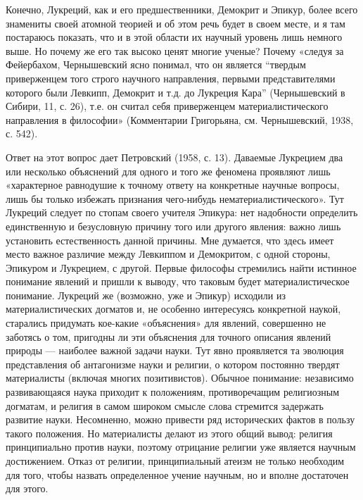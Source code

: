 Конечно, Лукреций, как и его предшественники, Демокрит и Эпикур, более
всего знамениты  своей атомной теорией  и об  этом речь будет  в своем
месте,  и  я  там  постараюсь  показать,  что  и  в  этой  области  их
научный  уровень  лишь немного  выше.  Но  почему  же его  так  высоко
ценят многие  ученые? Почему «следуя за  Фейербахом, Чернышевский ясно
понимал, что  он является ``твердым приверженцем  того строго научного
направления, первыми представителями которого были Левкипп, Демокрит и
т.д. до  Лукреция Кара'' (Чернышевский в  Сибири, 11, с. 26),  т.е. он
считал себя приверженцем  материалистического направления в философии»
(Комментарии Григорьяна, см. Чернышевский, 1938, с. 542).

Ответ  на  этот  вопрос  дает   Петровский  (1958,  с.  13).  Даваемые
Лукрецием два или  несколько объяснений для одного и  того же феномена
проявляют лишь «характерное равнодушие  к точному ответу на конкретные
научные  вопросы,  лишь  бы   только  избежать  признания  чего-нибудь
нематериалистического». Тут Лукреций следует  по стопам своего учителя
Эпикура: нет надобности определить  единственную и безусловную причину
того или другого явления:  важно лишь установить естественность данной
причины. Мне  думается, что  здесь имеет  место важное  различие между
Левкиппом  и Демокритом,  с  одной стороны,  Эпикуром  и Лукрецием,  с
другой. Первые философы стремились  найти истинное понимание явлений и
пришли  к  выводу,  что таковым  будет  материалистическое  понимание.
Лукреций же  (возможно, уже  и Эпикур) исходили  из материалистических
догматов  и,  не  особенно интересуясь  конкретной  наукой,  старались
придумать кое-какие «объяснения» для явлений, совершенно не заботясь о
том, пригодны ли  эти объяснения для точного  описания явлений природы
--- наиболее  важной задачи  науки. Тут  явно проявляется  та эволюция
представления  об антагонизме  науки  и религии,  о котором  постоянно
твердят материалисты (включая многих позитивистов). Обычное понимание:
независимо развивающаяся  наука приходит к  положениям, противоречащим
религиозным  догматам,   и  религия  в  самом   широком  смысле  слова
стремится  задержать развитие  науки. Несомненно,  можно привести  ряд
исторических фактов в пользу  такого положения. Но материалисты делают
из  этого общий  вывод:  религия принципиально  против науки,  поэтому
отрицание религии уже является  научным достижением. Отказ от религии,
принципиальный  атеизм не  только  необходим для  того, чтобы  назвать
определенное учение научным, но и вполне достаточен для этого.

